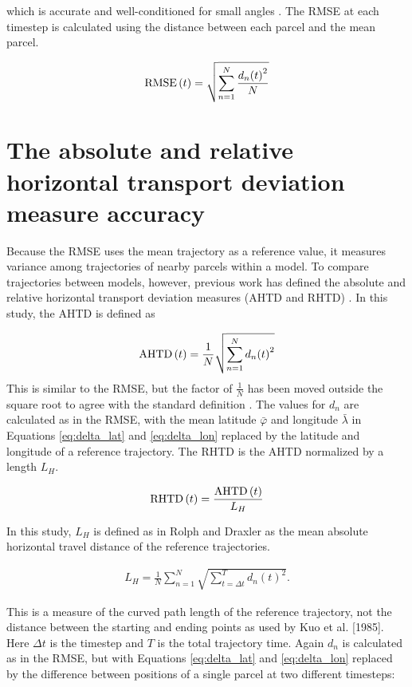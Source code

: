 which is accurate and well-conditioned for small angles \cite{sinnott_virtues_1984}. 
The RMSE at each timestep is calculated using the distance between each parcel and the mean parcel.

\begin{align}
    \operatorname{RMSE}{(t)} = \sqrt{ \sum_{n = 1}^{N} \frac{{d_n(t)}^2}{N} }
\end{align}

\section{The absolute and relative horizontal transport deviation measure accuracy}

Because the RMSE uses the mean trajectory as a reference value, it measures variance among trajectories of nearby parcels within a model.
To compare trajectories between models, however, previous work has defined the absolute and relative horizontal transport deviation measures (AHTD and RHTD) \cite{stohl_computation_1998}. 
In this study, the AHTD is defined as

\begin{align}
    \operatorname{AHTD}{(t)} = \frac{1}{N} \sqrt{ \sum_{n = 1}^{N} {d_n(t)}^2 }
\end{align}
This is similar to the RMSE, but the factor of $\frac{1}{N}$ has been moved outside the square root to agree with the standard definition \cite{kuo_accuracy_1985, rolph_sensitivity_1990}.
The values for $d_n$ are calculated as in the RMSE, with the mean latitude $\bar{\varphi}$ and longitude $\bar{\lambda}$ in Equations \ref{eq:delta_lat} and \ref{eq:delta_lon} replaced by the latitude and longitude of a reference trajectory.
The RHTD is the AHTD normalized by a length $L_H$.

\begin{align}
    \operatorname{RHTD}{(t)} = \frac{\operatorname{AHTD}{(t)}}{L_H}
\end{align}
 
In this study, $L_H$ is defined as in Rolph and Draxler as the mean absolute horizontal travel distance of the reference trajectories.

\begin{align}
    L_H = \frac{1}{N} \sum_{n = 1}^{N} \sqrt{ \sum_{t = \Delta t}^{T} {d_n(t)}^2}.
\end{align}

This is a measure of the curved path length of the reference trajectory, not the distance between the starting and ending points as used by Kuo et al. [1985].
Here $\Delta t$ is the timestep and $T$ is the total trajectory time.
Again $d_n$ is calculated as in the RMSE, but with Equations \ref{eq:delta_lat} and \ref{eq:delta_lon} replaced by the difference between positions of a single parcel at two different timesteps:

